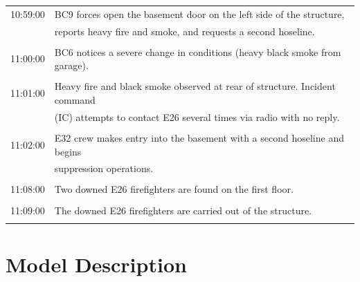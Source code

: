 \documentclass[12pt,oneside]{book}
\begin{document}
\begin{table}[!ht]
\begin{tabular}{cl}
10:59:00       &  BC9 forces open the basement door on the left side of the structure,                \\
               &  reports heavy fire and smoke, and requests a second hoseline.                       \\
               &                                                                                      \\
11:00:00       &  BC6 notices a severe change in conditions (heavy black smoke from garage).          \\
               &                                                                                      \\
11:01:00       &  Heavy fire and black smoke observed at rear of structure. Incident command          \\
               &  (IC) attempts to contact E26 several times via radio with no reply.                 \\
               &                                                                                      \\
11:02:00       &  E32 crew makes entry into the basement with a second hoseline and begins            \\
               &  suppression operations.                                                             \\
               &                                                                                      \\
11:08:00       &  Two downed E26 firefighters are found on the first floor.                           \\
               &                                                                                      \\
11:09:00       &  The downed E26 firefighters are carried out of the structure.                       \\
               &                                                                                      \\
\bottomrule
\end{tabular}
\label{tab:incident_timeline}
\end{table}
 

\chapter{Model Description}
\label{sec:model_description}
\end{document}
